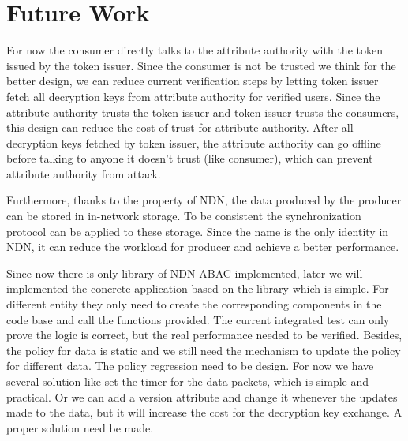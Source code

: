 \section{Future Work}

For now the consumer directly talks to the attribute authority with the token issued by the token issuer. Since the consumer is not be trusted we think for the better design, we can reduce current verification steps by letting token issuer fetch all decryption keys from attribute authority for verified users. Since the attribute authority trusts the token issuer and token issuer trusts the consumers, this design can reduce the cost of trust for attribute authority. After all decryption keys fetched by token issuer, the attribute authority can go offline before talking to anyone it doesn't trust (like consumer), which can prevent attribute authority from attack.

Furthermore, thanks to the property of NDN, the data produced by the producer can be stored in in-network storage. To be consistent the synchronization protocol can be applied to these storage. Since the name is the only identity in NDN, it can reduce the workload for producer and achieve a better performance.

Since now there is only library of NDN-ABAC implemented, later we will implemented the concrete application based on the library which is simple. For different entity they only need to create the corresponding components in the code base and call the functions provided. The current integrated test can only prove the logic is correct, but the real performance needed to be verified. Besides, the policy for data is static and we still need the mechanism to update the policy for different data. The policy regression need to be design. For now we have several solution like set the timer for the data packets, which is simple and practical. Or we can add a version attribute and change it whenever the updates made to the data, but it will increase the cost for the decryption key exchange. A proper solution need be made.